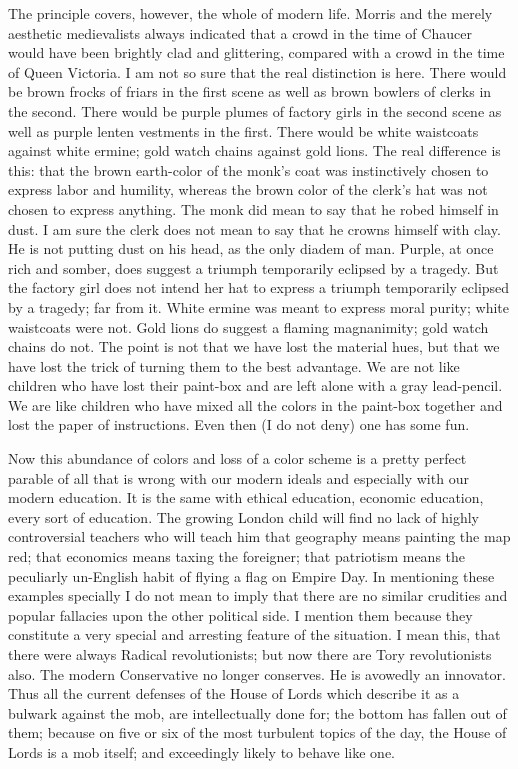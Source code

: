\documentclass{book}
\begin{document}
The principle covers, however, the whole of modern life. Morris and the merely aesthetic medievalists always indicated that a crowd in the time of Chaucer would have been brightly clad and glittering, compared with a crowd in the time of Queen Victoria. I am not so sure that the real distinction is here. There would be brown frocks of friars in the first scene as well as brown bowlers of clerks in the second. There would be purple plumes of factory girls in the second scene as well as purple lenten vestments in the first. There would be white waistcoats against white ermine; gold watch chains against gold lions. The real difference is this: that the brown earth-color of the monk’s coat was instinctively chosen to express labor and humility, whereas the brown color of the clerk’s hat was not chosen to express anything. The monk did mean to say that he robed himself in dust. I am sure the clerk does not mean to say that he crowns himself with clay. He is not putting dust on his head, as the only diadem of man. Purple, at once rich and somber, does suggest a triumph temporarily eclipsed by a tragedy. But the factory girl does not intend her hat to express a triumph temporarily eclipsed by a tragedy; far from it. White ermine was meant to express moral purity; white waistcoats were not. Gold lions do suggest a flaming magnanimity; gold watch chains do not. The point is not that we have lost the material hues, but that we have lost the trick of turning them to the best advantage. We are not like children who have lost their paint-box and are left alone with a gray lead-pencil. We are like children who have mixed all the colors in the paint-box together and lost the paper of instructions. Even then (I do not deny) one has some fun.

Now this abundance of colors and loss of a color scheme is a pretty perfect parable of all that is wrong with our modern ideals and especially with our modern education. It is the same with ethical education, economic education, every sort of education. The growing London child will find no lack of highly controversial teachers who will teach him that geography means painting the map red; that economics means taxing the foreigner; that patriotism means the peculiarly un-English habit of flying a flag on Empire Day. In mentioning these examples specially I do not mean to imply that there are no similar crudities and popular fallacies upon the other political side. I mention them because they constitute a very special and arresting feature of the situation. I mean this, that there were always Radical revolutionists; but now there are Tory revolutionists also. The modern Conservative no longer conserves. He is avowedly an innovator. Thus all the current defenses of the House of Lords which describe it as a bulwark against the mob, are intellectually done for; the bottom has fallen out of them; because on five or six of the most turbulent topics of the day, the House of Lords is a mob itself; and exceedingly likely to behave like one.
\end{document}
